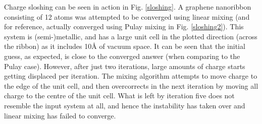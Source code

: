 Charge sloshing can be seen in action in Fig$.$ \ref{sloshing}. A graphene nanoribbon consisting of 12 atoms was attempted to be converged using linear mixing (and for reference, actually converged using Pulay mixing in Fig$.$ \ref{sloshing2}). This system is (semi-)metallic, and has a large unit cell in the plotted direction (across the ribbon) as it includes 10\AA \text{ } of vacuum space. It can be seen that the initial guess, as expected, is close to the converged answer (when comparing to the Pulay case). However, after just two iterations, large amounts of charge starts getting displaced per iteration. The mixing algorithm attempts to move charge to the edge of the unit cell, and then overcorrects in the next iteration by moving all charge to the centre of the unit cell. What is left by iteration five does not resemble the input system at all, and hence the instability has taken over and linear mixing has failed to converge.  

